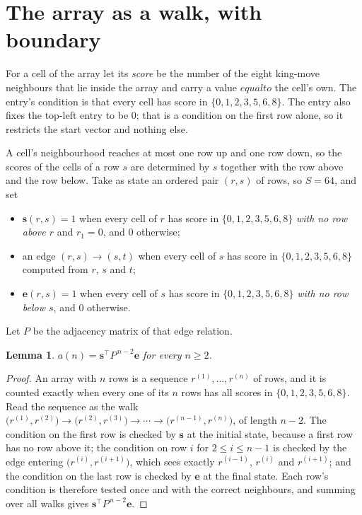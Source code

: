 \documentclass[11pt,a4paper]{article}
\theoremstyle{plain}
\newtheorem{lemma}[theorem]{Lemma}
\theoremstyle{definition}
\begin{document}
\section{The array as a walk, with boundary}

For a cell of the array let its \emph{score} be the number of the eight king-move neighbours that lie inside
the array and carry a value $equal to$ the cell's own. The entry's condition is that every cell
has score in $\{0,1,2,3,5,6,8\}$. The entry also fixes the top-left entry to be $0$; that is a condition on the first row alone, so it restricts the start vector and nothing else.

A cell's neighbourhood reaches at most one row up and one row down, so the scores of the
cells of a row $s$ are determined by $s$ together with the row above and the row below.
Take as state an ordered pair $(r,s)$ of rows, so $S=64$, and set
\begin{itemize}
\item $\mathbf{s}(r,s)=1$ when every cell of $r$ has score in $\{0,1,2,3,5,6,8\}$ \emph{with no row
above $r$} and $r_1=0$, and $0$ otherwise;
\item an edge $(r,s)\to(s,t)$ when every cell of $s$ has score in $\{0,1,2,3,5,6,8\}$ computed from
$r$, $s$ and $t$;
\item $\mathbf{e}(r,s)=1$ when every cell of $s$ has score in $\{0,1,2,3,5,6,8\}$ \emph{with no row
below $s$}, and $0$ otherwise.
\end{itemize}
Let $P$ be the adjacency matrix of that edge relation.

\begin{lemma}\label{lem:walk}
$a(n)=\mathbf{s}^{\!\top}P^{\,n-2}\mathbf{e}$ for every $n\ge2$.
\end{lemma}

\begin{proof}
An array with $n$ rows is a sequence $r^{(1)},\dots,r^{(n)}$ of rows, and it is counted
exactly when every one of its $n$ rows has all scores in $\{0,1,2,3,5,6,8\}$. Read the sequence as the
walk $\bigl(r^{(1)},r^{(2)}\bigr)\to\bigl(r^{(2)},r^{(3)}\bigr)\to\cdots\to
\bigl(r^{(n-1)},r^{(n)}\bigr)$, of length $n-2$. The condition on the first row is
checked by $\mathbf{s}$ at the initial state, because a first row has no row above it; the
condition on row $i$ for $2\le i\le n-1$ is checked by the edge entering
$\bigl(r^{(i)},r^{(i+1)}\bigr)$, which sees exactly $r^{(i-1)}$, $r^{(i)}$ and
$r^{(i+1)}$; and the condition on the last row is checked by $\mathbf{e}$ at the final
state. Each row's condition is therefore tested once and with the correct neighbours, and
summing over all walks gives $\mathbf{s}^{\!\top}P^{\,n-2}\mathbf{e}$.
\end{proof}
\end{document}
